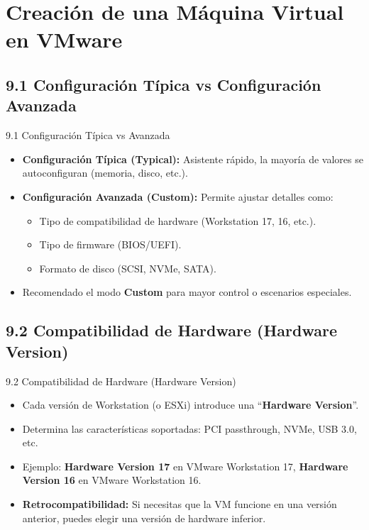\documentclass{beamer}
\begin{document}
\section{Creación de una Máquina Virtual en VMware}

\subsection{9.1 Configuración Típica vs Configuración Avanzada}
\begin{frame}{9.1 Configuración Típica vs Avanzada}
    \begin{itemize}
        \item \textbf{Configuración Típica (Typical):} Asistente rápido, la mayoría de valores se autoconfiguran (memoria, disco, etc.).
        \item \textbf{Configuración Avanzada (Custom):} Permite ajustar detalles como:
            \begin{itemize}
                \item Tipo de compatibilidad de hardware (Workstation 17, 16, etc.).
                \item Tipo de firmware (BIOS/UEFI).
                \item Formato de disco (SCSI, NVMe, SATA).
            \end{itemize}
        \item Recomendado el modo \textbf{Custom} para mayor control o escenarios especiales.
    \end{itemize}
\end{frame}

\subsection{9.2 Compatibilidad de Hardware (Hardware Version)}
\begin{frame}{9.2 Compatibilidad de Hardware (Hardware Version)}
    \begin{itemize}
        \item Cada versión de Workstation (o ESXi) introduce una “\textbf{Hardware Version}”.
        \item Determina las características soportadas: PCI passthrough, NVMe, USB 3.0, etc.
        \item Ejemplo: \textbf{Hardware Version 17} en VMware Workstation 17, \textbf{Hardware Version 16} en VMware Workstation 16.
        \item \textbf{Retrocompatibilidad:} Si necesitas que la VM funcione en una versión anterior, puedes elegir una versión de hardware inferior.
    \end{itemize}
\end{frame}
\end{document}
